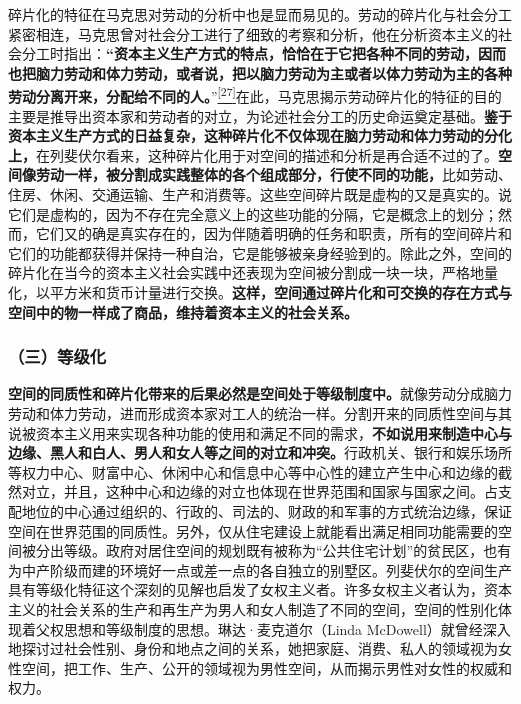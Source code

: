 \documentclass[UTF8, fontset = sourcesans, a4paper, oneside, zihao =
-4, scheme=chinese, no-math, space=true]{ctexbook}
\begin{document}
碎片化的特征在马克思对劳动的分析中也是显而易见的。劳动的碎片化与社会分工紧密相连，马克思曾对社会分工进行了细致的考察和分析，他在分析资本主义的社会分工时指出：\textbf{``资本主义生产方式的特点，恰恰在于它把各种不同的劳动，因而也把脑力劳动和体力劳动，或者说，把以脑力劳动为主或者以体力劳动为主的各种劳动分离开来，分配给不同的人。}''\protect\hypertarget{part0007_split_001.htmlux5cux23w27}{}{}\protect\hyperlink{part0007_split_004.htmlux5cux23m27}{\textsuperscript{{[}27{]}}}在此，马克思揭示劳动碎片化的特征的目的主要是推导出资本家和劳动者的对立，为论述社会分工的历史命运奠定基础。\textbf{鉴于资本主义生产方式的日益复杂，这种碎片化不仅体现在脑力劳动和体力劳动的分化上，}在列斐伏尔看来，这种碎片化用于对空间的描述和分析是再合适不过的了。\textbf{空间像劳动一样，被分割成实践整体的各个组成部分，行使不同的功能，}比如劳动、住房、休闲、交通运输、生产和消费等。这些空间碎片既是虚构的又是真实的。说它们是虚构的，因为不存在完全意义上的这些功能的分隔，它是概念上的划分；然而，它们又的确是真实存在的，因为伴随着明确的任务和职责，所有的空间碎片和它们的功能都获得并保持一种自治，它是能够被亲身经验到的。除此之外，空间的碎片化在当今的资本主义社会实践中还表现为空间被分割成一块一块，严格地量化，以平方米和货币计量进行交换。\textbf{这样，空间通过碎片化和可交换的存在方式与空间中的物一样成了商品，维持着资本主义的社会关系。}

\subsubsection{（三）等级化}\label{part0007_split_001.htmlux5cux23d013}

\textbf{空间的同质性和碎片化带来的后果必然是空间处于等级制度中。}就像劳动分成脑力劳动和体力劳动，进而形成资本家对工人的统治一样。分割开来的同质性空间与其说被资本主义用来实现各种功能的使用和满足不同的需求，\textbf{不如说用来制造中心与边缘、黑人和白人、男人和女人等之间的对立和冲突。}行政机关、银行和娱乐场所等权力中心、财富中心、休闲中心和信息中心等中心性的建立产生中心和边缘的截然对立，并且，这种中心和边缘的对立也体现在世界范围和国家与国家之间。占支配地位的中心通过组织的、行政的、司法的、财政的和军事的方式统治边缘，保证空间在世界范围的同质性。另外，仅从住宅建设上就能看出满足相同功能需要的空间被分出等级。政府对居住空间的规划既有被称为``公共住宅计划''的贫民区，也有为中产阶级而建的环境好一点或差一点的各自独立的别墅区。列斐伏尔的空间生产具有等级化特征这个深刻的见解也启发了女权主义者。许多女权主义者认为，资本主义的社会关系的生产和再生产为男人和女人制造了不同的空间，空间的性别化体现着父权思想和等级制度的思想。琳达·麦克道尔（Linda
McDowell）就曾经深入地探讨过社会性别、身份和地点之间的关系，她把家庭、消费、私人的领域视为女性空间，把工作、生产、公开的领域视为男性空间，从而揭示男性对女性的权威和权力。
\end{document}
